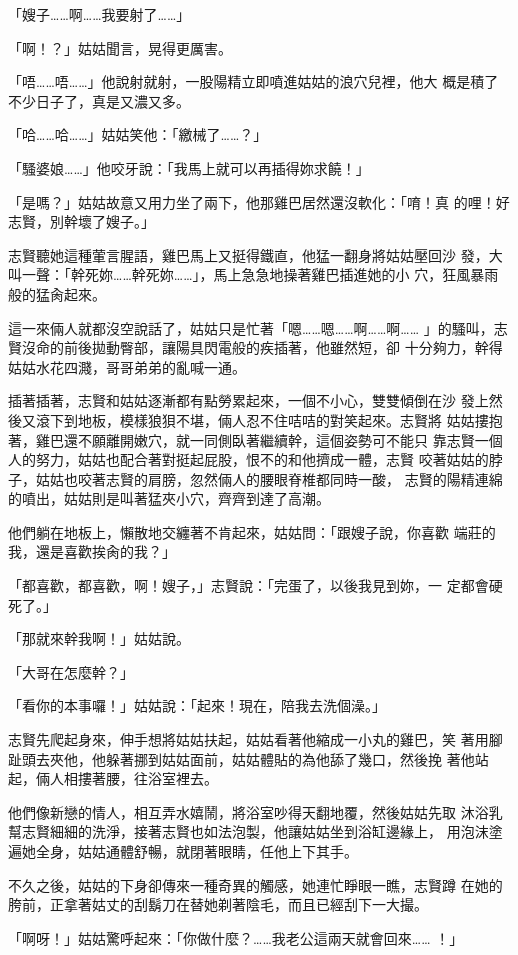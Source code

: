 「嫂子……啊……我要射了……」

「啊！？」姑姑聞言，晃得更厲害。

「唔……唔……」他說射就射，一股陽精立即噴進姑姑的浪穴兒裡，他大
概是積了不少日子了，真是又濃又多。

「哈……哈……」姑姑笑他：「繳械了……？」

「騷婆娘……」他咬牙說：「我馬上就可以再插得妳求饒！」

「是嗎？」姑姑故意又用力坐了兩下，他那雞巴居然還沒軟化：「唷！真
的哩！好志賢，別幹壞了嫂子。」

志賢聽她這種葷言腥語，雞巴馬上又挺得鐵直，他猛一翻身將姑姑壓回沙
發，大叫一聲：「幹死妳……幹死妳……」，馬上急急地操著雞巴插進她的小
穴，狂風暴雨般的猛肏起來。

這一來倆人就都沒空說話了，姑姑只是忙著「嗯……嗯……啊……啊……
」的騷叫，志賢沒命的前後拋動臀部，讓陽具閃電般的疾插著，他雖然短，卻
十分夠力，幹得姑姑水花四濺，哥哥弟弟的亂喊一通。

插著插著，志賢和姑姑逐漸都有點勞累起來，一個不小心，雙雙傾倒在沙
發上然後又滾下到地板，模樣狼狽不堪，倆人忍不住咭咭的對笑起來。志賢將
姑姑摟抱著，雞巴還不願離開嫩穴，就一同側臥著繼續幹，這個姿勢可不能只
靠志賢一個人的努力，姑姑也配合著對挺起屁股，恨不的和他擠成一體，志賢
咬著姑姑的脖子，姑姑也咬著志賢的肩膀，忽然倆人的腰眼脊椎都同時一酸，
志賢的陽精連綿的噴出，姑姑則是叫著猛夾小穴，齊齊到達了高潮。

他們躺在地板上，懶散地交纏著不肯起來，姑姑問：「跟嫂子說，你喜歡
端莊的我，還是喜歡挨肏的我？」

「都喜歡，都喜歡，啊！嫂子，」志賢說：「完蛋了，以後我見到妳，一
定都會硬死了。」

「那就來幹我啊！」姑姑說。

「大哥在怎麼幹？」

「看你的本事囉！」姑姑說：「起來！現在，陪我去洗個澡。」

志賢先爬起身來，伸手想將姑姑扶起，姑姑看著他縮成一小丸的雞巴，笑
著用腳趾頭去夾他，他躲著挪到姑姑面前，姑姑體貼的為他舔了幾口，然後挽
著他站起，倆人相摟著腰，往浴室裡去。

他們像新戀的情人，相互弄水嬉鬧，將浴室吵得天翻地覆，然後姑姑先取
沐浴乳幫志賢細細的洗淨，接著志賢也如法泡製，他讓姑姑坐到浴缸邊緣上，
用泡沫塗遍她全身，姑姑通體舒暢，就閉著眼睛，任他上下其手。

不久之後，姑姑的下身卻傳來一種奇異的觸感，她連忙睜眼一瞧，志賢蹲
在她的胯前，正拿著姑丈的刮鬍刀在替她剃著陰毛，而且已經刮下一大撮。

「啊呀！」姑姑驚呼起來：「你做什麼？……我老公這兩天就會回來……
！」

